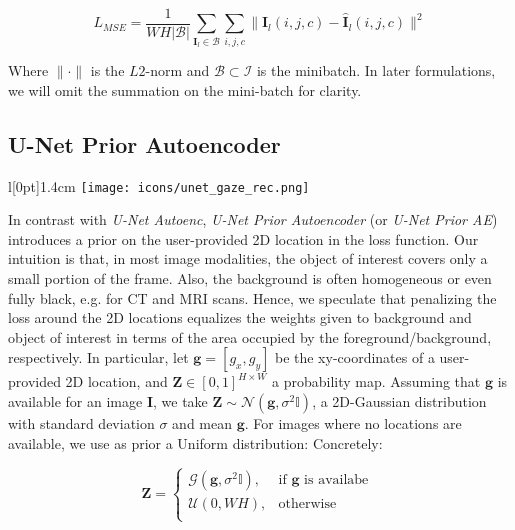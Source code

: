 \begin{equation}
L_{MSE} = \frac{1}{W H |\mathcal{B}|} \sum_{\boldsymbol{I}_l \in \mathcal{B}} \sum_{i,j,c} \|\boldsymbol{I}_l(i,j,c) - \boldsymbol{\hat{I}}_l(i,j,c)\|^2
\label{eq:mse_loss}
\end{equation}
\vspace{6pt}

Where $\| \cdot \|$ is the $L2$-norm and $\mathcal{B} \subset \mathcal{I}$ is the minibatch.
In later formulations, we will omit the summation on the mini-batch for clarity.

\clearpage
\subsection{U-Net Prior Autoencoder} \label{unet_gaze_rec}
\begingroup
\setlength\intextsep{0pt}
\begin{wrapfigure}[4]{l}[0pt]{1.4cm}
\texttt{[image: icons/unet\_gaze\_rec.png]}
\end{wrapfigure}

In contrast with \textit{U-Net Autoenc}, \textit{U-Net Prior Autoencoder} (or \textit{U-Net Prior AE}) introduces a prior on the user-provided 2D location in the loss function.
Our intuition is that, in most image modalities, the object of interest covers only a small portion of the frame.
Also, the background is often homogeneous or even fully black, e.g. for CT and MRI scans.
Hence, we speculate that penalizing the loss around the 2D locations equalizes the weights given to background and object of interest in terms of the area occupied by the foreground/background, respectively.
In particular, let $\boldsymbol{g} = [g_x, g_y]$ be the xy-coordinates of a user-provided 2D location, and  $\boldsymbol{Z} \in [0,1]^{H \times W}$ a probability map.
Assuming that $\boldsymbol{g}$ is available for an image $\boldsymbol{I}$, we take $\boldsymbol{Z} \sim \mathcal{N}(\boldsymbol{g}, \sigma^2\mathbb{I})$, a 2D-Gaussian distribution with standard deviation $\sigma$ and mean $\boldsymbol{g}$.
For images where no locations are available, we use as prior a Uniform distribution:
Concretely:

\begin{equation}
\boldsymbol{Z} = 
\begin{cases}
  \mathcal{G}(\boldsymbol{g}, \sigma^2\mathbb{I}),         & \text{if $\bm{g}$ is availabe }\\
  \mathcal{U}(0,WH),& \text{otherwise}\\
\end{cases}
\label{eq:gaussian}
\end{equation}
\hspace{6pt}

